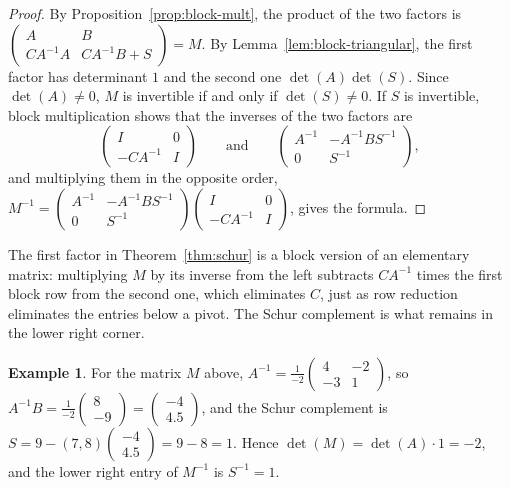 \documentclass[11pt]{article}
\theoremstyle{definition}
\newtheorem{example}[definition]{Example}
\theoremstyle{plain}
\theoremstyle{remark}
\begin{document}
\begin{proof}
    By Proposition~\ref{prop:block-mult}, the product of the two factors is $\begin{pmatrix} A & B \\ CA^{-1}A & CA^{-1}B + S \end{pmatrix} = M$. By Lemma~\ref{lem:block-triangular}, the first factor has determinant $1$ and the second one $\det(A)\det(S)$. Since $\det(A) \neq 0$, $M$ is invertible if and only if $\det(S) \neq 0$. If $S$ is invertible, block multiplication shows that the inverses of the two factors are
    \[\begin{pmatrix} I & 0 \\ -CA^{-1} & I \end{pmatrix} \qquad \text{and} \qquad \begin{pmatrix} A^{-1} & -A^{-1}BS^{-1} \\ 0 & S^{-1} \end{pmatrix},\]
    and multiplying them in the opposite order, $M^{-1} = \begin{pmatrix} A^{-1} & -A^{-1}BS^{-1} \\ 0 & S^{-1} \end{pmatrix}\begin{pmatrix} I & 0 \\ -CA^{-1} & I \end{pmatrix}$, gives the formula.
\end{proof}

The first factor in Theorem~\ref{thm:schur} is a block version of an elementary matrix: multiplying $M$ by its inverse from the left subtracts $CA^{-1}$ times the first block row from the second one, which eliminates $C$, just as row reduction eliminates the entries below a pivot. The Schur complement is what remains in the lower right corner.

\begin{example}\label{ex:schur}
    For the matrix $M$ above, $A^{-1} = \frac{1}{-2}\begin{pmatrix} 4 & -2 \\ -3 & 1 \end{pmatrix}$, so $A^{-1}B = \frac{1}{-2}\begin{pmatrix} 8 \\ -9 \end{pmatrix} = \begin{pmatrix} -4 \\ 4.5 \end{pmatrix}$, and the Schur complement is $S = 9 - (7, 8)\begin{pmatrix} -4 \\ 4.5 \end{pmatrix} = 9 - 8 = 1$. Hence $\det(M) = \det(A) \cdot 1 = -2$, and the lower right entry of $M^{-1}$ is $S^{-1} = 1$.
\end{example}
\end{document}
